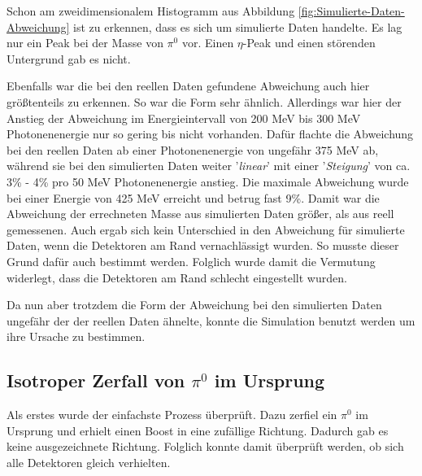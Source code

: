 \documentclass[a4paper,11pt,oneside,final,german,openbib,pdftex]{scrbook}
\begin{document}
{ 


Schon am zweidimensionalem Histogramm aus Abbildung \ref{fig:Simulierte-Daten-Abweichung} ist zu erkennen, dass es sich um simulierte Daten handelte. Es lag nur ein Peak bei der Masse von $\pi^0$ vor. Einen $\eta$-Peak und einen störenden Untergrund gab es nicht. 

Ebenfalls war die bei den reellen Daten gefundene Abweichung auch hier größtenteils zu erkennen. So war die Form sehr ähnlich. Allerdings war hier der Anstieg der Abweichung im Energieintervall von 200 MeV bis 300 MeV Photonenenergie nur so gering bis nicht vorhanden. Dafür flachte die Abweichung bei den reellen Daten ab einer Photonenenergie von ungefähr 375 MeV ab, während sie bei den simulierten Daten weiter '\textit{linear}' mit einer '\textit{Steigung}' von ca. 3\% - 4\% pro 50 MeV Photonenenergie anstieg. Die maximale Abweichung wurde bei einer Energie von 425 MeV erreicht und betrug fast 9\%. Damit war die Abweichung der errechneten Masse aus simulierten Daten größer, als aus reell gemessenen. Auch ergab sich kein Unterschied in den Abweichung für simulierte Daten, wenn die Detektoren am Rand vernachlässigt wurden. So musste dieser Grund dafür auch bestimmt werden. Folglich wurde damit die Vermutung widerlegt, dass die Detektoren am Rand schlecht eingestellt wurden.

Da nun aber trotzdem die Form der Abweichung bei den simulierten Daten ungefähr der der reellen Daten ähnelte, konnte die Simulation benutzt werden um ihre Ursache zu bestimmen.


\subsection{Isotroper Zerfall von $\pi^0$ im Ursprung}
\label{sec:Isotroper-Zerfall-Ursprung}

Als erstes wurde der einfachste Prozess \"uberpr\"uft. Dazu zerfiel ein $\pi^0$ im Ursprung und erhielt einen Boost in eine zufällige Richtung. Dadurch gab es keine ausgezeichnete Richtung. Folglich konnte damit überprüft werden, ob sich alle Detektoren gleich verhielten. 

}
\end{document}
